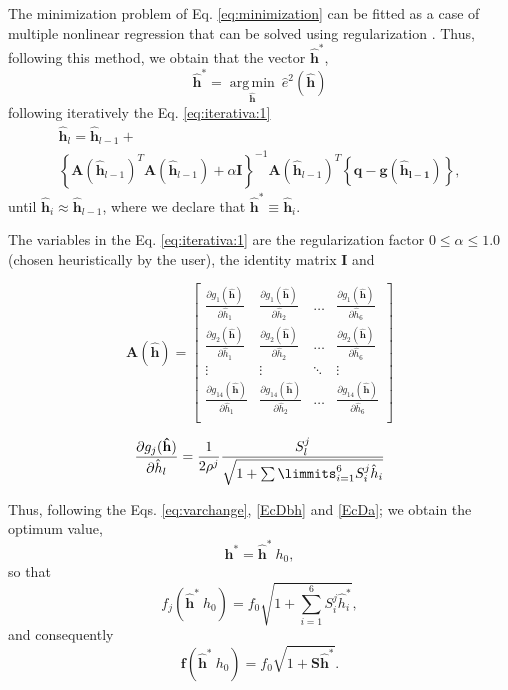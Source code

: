 \documentclass[11pt,twocolumn]{article}
\newcommand{\DERPAR}[4]{\frac{\partial #1_{#3}(\mathbf{\hat{#2}})}{ \partial \hat{#2}_{#4}}}
\begin{document}
The minimization problem of Eq. \ref{eq:minimization} can be fitted as a case of multiple nonlinear regression 
that can be solved using regularization 
\cite[pp. 129]{pujaicoriverafernando2020}. 
Thus, following this method, we obtain that the vector $\mathbf{\hat{h}}^{*}$, 
\begin{equation}
\mathbf{\hat{h}}^{*}= \underset{\mathbf{\hat{h}}}{\operatorname {arg\,min}}~\hat{e}^2(\mathbf{\hat{h}})
\end{equation}
following iteratively the Eq. \ref{eq:iterativa:1} 
\small
\begin{equation}\label{eq:iterativa:1}
\begin{array}{l}
\mathbf{\hat{h}}_{l} = \mathbf{\hat{h}}_{l-1}+\\ 
\left\{\mathbf{A}(\mathbf{\hat{h}}_{l-1})^{T} \mathbf{A}(\mathbf{\hat{h}}_{l-1})+\alpha \mathbf{I}\right\}^{-1}
\mathbf{A}(\mathbf{\hat{h}}_{l-1})^{T} \left\{\mathbf{q}-\mathbf{g}(\mathbf{\hat{h}_{l-1}})\right\},
\end{array}
\end{equation}
\normalsize
until $\mathbf{\hat{h}}_{i} \approx \mathbf{\hat{h}}_{l-1}$,
where we declare that $\mathbf{\hat{h}}^{*} \equiv \mathbf{\hat{h}}_{i}$. 

The variables in the Eq. \ref{eq:iterativa:1} are the regularization factor $0 \leq \alpha \leq 1.0$ 
(chosen heuristically  by the user), the identity matrix $\mathbf{I}$ and

\begin{equation}
\mathbf{A}(\mathbf{\hat{h}})=
\left[
\begin{matrix}
\DERPAR{g}{h}{1}{1} & \DERPAR{g}{h}{1}{2} & \hdots & \DERPAR{g}{h}{1}{6} \\ 
\DERPAR{g}{h}{2}{1} & \DERPAR{g}{h}{2}{2} & \hdots & \DERPAR{g}{h}{2}{6} \\
\vdots & \vdots & \ddots & \vdots \\ 
\DERPAR{g}{h}{14}{1} & \DERPAR{g}{h}{14}{2} & \hdots & \DERPAR{g}{h}{14}{6} \\
\end{matrix}
\right]
\end{equation}

\begin{equation}
\DERPAR{g}{h}{j}{l}=
\frac{1}{2 \rho^j}\frac{S_{l}^{j}}{\sqrt{1+\sum\limmits_{i=1}^{6} S_{i}^{j} \hat{h}_i}}
\end{equation}

Thus, following the Eqs. \ref{eq:varchange}, \ref{EcDbh} and \ref{EcDa}; we obtain the optimum value,
\begin{equation} \label{eq:optimalh}
\mathbf{h}^* = \mathbf{\hat{h}^*}~h_0,
\end{equation}
so that
\begin{equation} \label{EcDbhath}
f_j(\mathbf{\hat{h}^*}~h_0) = f_0 \sqrt{1 +\sum_{i=1}^{6}{S^{j}_{i} \hat{h}^*_i}},
\end{equation}
and consequently
\begin{equation} \label{EcDbhathvec}
\mathbf{f}(\mathbf{\hat{h}^*}~h_0)= f_0 \sqrt{1 +\mathbf{S} \mathbf{\hat{h}^*}}.
\end{equation}
\end{document}
